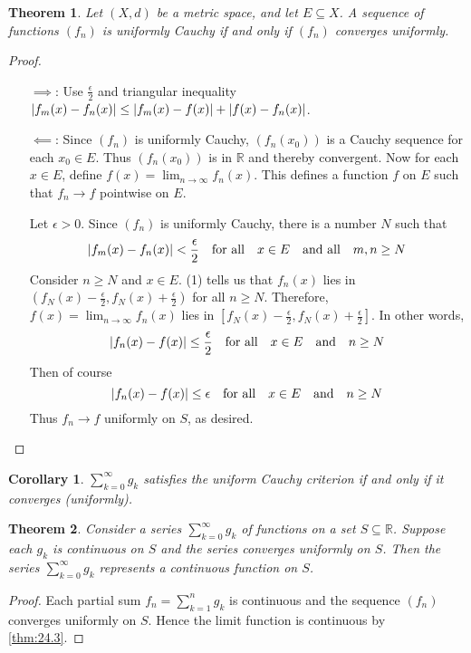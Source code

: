 \documentclass[12pt, lettersize]{book}
\theoremstyle{plain}
\newtheorem{thm}{Theorem}[section]
\newtheorem{cor}{Corollary}[thm]
\theoremstyle{definition}
\theoremstyle{remark}
\newcommand{\R}{\mathbb{R}}
\begin{document}
			\setcounter{equation}{0}
			\begin{thm}\label{thm:25.4}
				Let $(X,d)$ be a metric space, and let $E\subseteq X$. A sequence of functions $(f_n)$ is \emph{uniformly Cauchy} if and only if $(f_n)$ converges uniformly.
			\end{thm}
			\begin{proof}
			\begin{itemize}
				\item[$\implies$:] Use $\frac{\epsilon}{2}$ and triangular inequality $\abs{f_m(x)-f_n(x)}\leq\abs{f_m(x)-f(x)}+\abs{f(x)-f_n(x)}$.
				\item[$\impliedby$:] Since $(f_n)$ is uniformly Cauchy, $(f_n(x_0))$ is a Cauchy sequence for each $x_0\in E$. Thus $(f_n(x_0))$ is in $\R$ and thereby convergent. Now for each $x\in E$, define $f(x)=\lim_{n\rightarrow\infty}f_n(x)$. This defines a function $f$ on $E$ such that $f_n\rightarrow f$ pointwise on $E$.
				
				Let $\epsilon>0$. Since $(f_n)$ is uniformly Cauchy, there is a number $N$ such that 
				\begin{equation}
					\abs{f_m(x)-f_n(x)}<\frac{\epsilon}{2}\quad\text{for all}\quad x\in E\quad\text{and all}\quad m,n\geq N
				\end{equation}
				Consider $n\geq N$ and $x\in E$. (1) tells us that $f_n(x)$ lies in $(f_N(x)-\frac{\epsilon}{2},f_N(x)+\frac{\epsilon}{2})$ for all $n\geq N$. Therefore, $f(x)=\lim_{n\rightarrow \infty}f_n(x)$ lies in $[f_N(x)-\frac{\epsilon}{2},f_N(x)+\frac{\epsilon}{2}]$. In other words,
				\begin{displaymath}
					\abs{f_n(x)-f(x)}\leq\frac{\epsilon}{2}\quad\text{for all}\quad x\in E\quad\text{and}\quad n\geq N
				\end{displaymath}
				Then of course
				\begin{displaymath}
					\abs{f_n(x)-f(x)}\leq\epsilon\quad\text{for all}\quad x\in E\quad\text{and}\quad n\geq N
				\end{displaymath}
				Thus $f_n\rightarrow f$ uniformly on $S$, as desired.
			\end{itemize}
			\end{proof}
			\begin{cor}
				$\sum_{k=0}^{\infty}g_k$ satisfies the uniform Cauchy criterion if and only if it converges (uniformly).
			\end{cor}
			
			\begin{thm}\label{thm:25.5}
			Consider a series $\sum_{k=0}^{\infty}g_k$ of functions on a set $S\subseteq\R$. Suppose each $g_k$ is continuous on $S$ and the series converges uniformly on $S$. Then the series $\sum_{k=0}^{\infty}g_k$ represents a continuous function on $S$.
			\end{thm}
			\begin{proof}
			Each partial sum $f_n=\sum_{k=1}^{n}g_k$ is continuous and the sequence $(f_n)$ converges uniformly on $S$. Hence the limit function is continuous by \ref{thm:24.3}.
			\end{proof}
			
\end{document}
